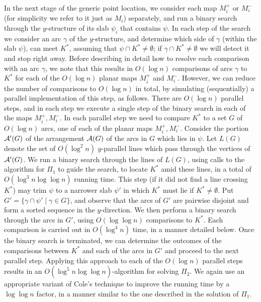 \documentclass[a4paper,12pt]{article}
\def\A{{\cal A}}
\begin{document}
In the next stage of the generic point location, we consider each
map $M_i^+$ or $M_i^-$ (for simplicity we refer to it just as $M_i$)
separately, and run a binary search through the $y$-structure of its
slab $\psi_i$ that contains $\psi$. In each step of the search we
consider an arc $\gamma$ of the $y$-structure, and determine which
side of $\gamma$ (within the slab $\psi$), can meet $K^*$, assuming
that $\psi \cap K^* \neq \emptyset$; if $\gamma \cap K^* \neq
\emptyset$ we will detect it and stop right away. Before describing
in detail how to resolve each comparison with an arc $\gamma$, we
note that this results in $O(\log n)$ comparisons of arcs $\gamma$
to $K^*$ for each of the $O(\log n)$ planar maps $M_i^+$ and
$M_i^-$. However, we can reduce the number of comparisons to $O(\log
n)$ in total, by simulating (sequentially) a parallel implementation
of this step, as follows. There are $O(\log n)$ parallel steps, and
in each step we execute a single step of the binary search in each
of the maps $M_i^+, M_i^-$. In each parallel step we need to compare
$K^*$ to a set $G$ of $O(\log n)$ arcs, one of each of the planar
maps $M_i^+, M_i^-$. Consider the portion $\A'(G)$ of the
arrangement $\A(G)$ of the arcs in $G$ which lies in $\psi$. Let
$L(G)$ denote the set of $O(\log^2 n)$ $y$-parallel lines which pass
through the vertices of $\A'(G)$. We run a binary search through the
lines of $L(G)$, using calls to the algorithm for $\Pi_1$ to guide
the search, to locate $K^*$ amid these lines, in a total of
$O(\log^3 n \log \log n)$ running time. This step (if it did not
find a line crossing $K^*$) may trim $\psi$ to a narrower slab
$\psi'$ in which $K^*$ must lie if $K^* \neq \emptyset$. Put $G' =
\{\gamma \cap \psi' \mid \gamma \in G\}$, and observe that the arcs
of $G'$ are pairwise disjoint and form a sorted sequence in the
$y$-direction. We then perform a binary search through the arcs in
$G'$, using $O(\log \log n)$ comparisons to $K^*$. Each comparison
is carried out in $O(\log^4 n)$ time, in a manner detailed below.
Once the binary search is terminated, we can determine the outcomes
of the comparisons between $K^*$ and each of the arcs in $G'$ and
proceed to the next parallel step. Applying this approach to each of
the $O(\log n)$ parallel steps results in an $O(\log^5 n \log \log
n)$-algorithm for solving $\Pi_2$. We again use an appropriate
variant of Cole's technique to improve the running time by a $\log
\log n$ factor, in a manner similar to the one described in the
solution of $\Pi_1$.
\end{document}
